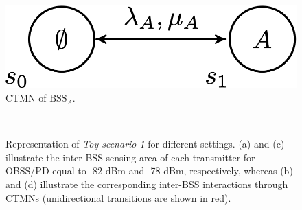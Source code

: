 \documentclass{ieeeaccess}
\begin{document}
\begin{figure}[h!!!!]	
	\centering
	\includegraphics[width=0.45\columnwidth]{ctmn}
	\caption{CTMN of $\text{BSS}_A$.} 
	\label{fig:ctmn}
\end{figure}

\begin{figure}[h!]
	\centering
	\hspace{1cm}
	\\
	\hspace{1cm}
	\caption{Representation of \emph{Toy scenario 1} for different settings. (a) and (c) illustrate the inter-BSS sensing area of each transmitter for OBSS/PD equal to -82 dBm and -78 dBm, respectively, whereas (b) and (d) illustrate the corresponding inter-BSS interactions through CTMNs (unidirectional transitions are shown in red).}
	\label{fig:toy_scenario_1b}
\end{figure}
\end{document}
